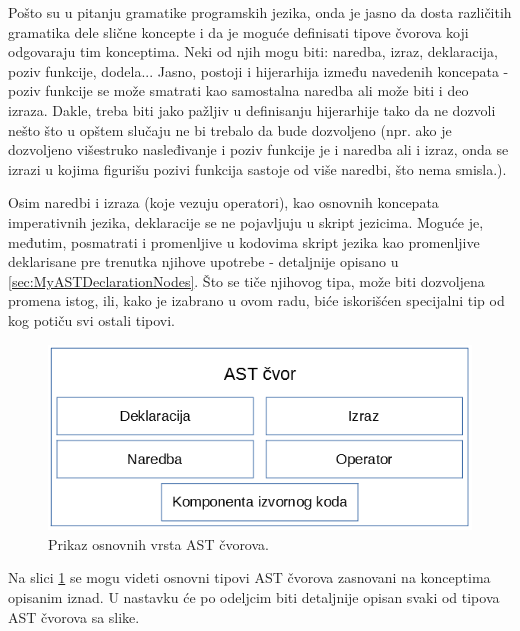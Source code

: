 Pošto su u pitanju gramatike programskih jezika, onda je jasno da dosta različitih gramatika dele slične koncepte i da je moguće definisati tipove čvorova koji odgovaraju tim konceptima. Neki od njih mogu biti: naredba, izraz, deklaracija, poziv funkcije, dodela... Jasno, postoji i hijerarhija između navedenih koncepata - poziv funkcije se može smatrati kao samostalna naredba ali može biti i deo izraza. Dakle, treba biti jako pažljiv u definisanju hijerarhije tako da ne dozvoli nešto što u opštem slučaju ne bi trebalo da bude dozvoljeno (npr. ako je dozvoljeno višestruko nasleđivanje i poziv funkcije je i naredba ali i izraz, onda se izrazi u kojima figurišu pozivi funkcija sastoje od više naredbi, što nema smisla.).

Osim naredbi i izraza (koje vezuju operatori), kao osnovnih koncepata imperativnih jezika, deklaracije se ne pojavljuju u skript jezicima. Moguće je, međutim, posmatrati i promenljive u kodovima skript jezika kao promenljive deklarisane pre trenutka njihove upotrebe - detaljnije opisano u \ref{sec:MyASTDeclarationNodes}. Što se tiče njihovog tipa, može biti dozvoljena promena istog, ili, kako je izabrano u ovom radu, biće iskorišćen specijalni tip od kog potiču svi ostali tipovi.

\begin{figure}[h!]
    \centering
        \includegraphics[scale=0.7]{images/nodes.png}
    \caption{Prikaz osnovnih vrsta AST čvorova.}
    \label{fig:ASTNode}
\end{figure}

Na slici \ref{fig:ASTNode} se mogu videti osnovni tipovi AST čvorova zasnovani na konceptima opisanim iznad. U nastavku će po odeljcim biti detaljnije opisan svaki od tipova AST čvorova sa slike.





